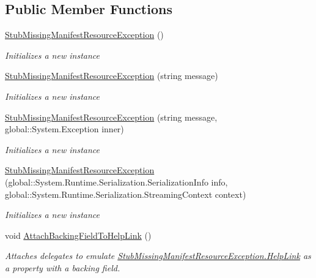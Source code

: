 \subsection*{Public Member Functions}
\begin{DoxyCompactItemize}
\item 
\hyperlink{class_system_1_1_resources_1_1_fakes_1_1_stub_missing_manifest_resource_exception_a3e02fd97284d3d8bd328d3ad11733f7a}{Stub\-Missing\-Manifest\-Resource\-Exception} ()
\begin{DoxyCompactList}\small\item\em Initializes a new instance\end{DoxyCompactList}\item 
\hyperlink{class_system_1_1_resources_1_1_fakes_1_1_stub_missing_manifest_resource_exception_af4e18492d1b9b3498101ae106c8bfc5c}{Stub\-Missing\-Manifest\-Resource\-Exception} (string message)
\begin{DoxyCompactList}\small\item\em Initializes a new instance\end{DoxyCompactList}\item 
\hyperlink{class_system_1_1_resources_1_1_fakes_1_1_stub_missing_manifest_resource_exception_a6f4668bbdab3f16f58813e8a607e9a70}{Stub\-Missing\-Manifest\-Resource\-Exception} (string message, global\-::\-System.\-Exception inner)
\begin{DoxyCompactList}\small\item\em Initializes a new instance\end{DoxyCompactList}\item 
\hyperlink{class_system_1_1_resources_1_1_fakes_1_1_stub_missing_manifest_resource_exception_a69baf59dff29d3c4faf5bd9926056ee5}{Stub\-Missing\-Manifest\-Resource\-Exception} (global\-::\-System.\-Runtime.\-Serialization.\-Serialization\-Info info, global\-::\-System.\-Runtime.\-Serialization.\-Streaming\-Context context)
\begin{DoxyCompactList}\small\item\em Initializes a new instance\end{DoxyCompactList}\item 
void \hyperlink{class_system_1_1_resources_1_1_fakes_1_1_stub_missing_manifest_resource_exception_aae8773a365a2341e8e49f70a2af57b1c}{Attach\-Backing\-Field\-To\-Help\-Link} ()
\begin{DoxyCompactList}\small\item\em Attaches delegates to emulate \hyperlink{class_system_1_1_resources_1_1_fakes_1_1_stub_missing_manifest_resource_exception_a2f4de3717d03f1edca5b06c2d4d1e801}{Stub\-Missing\-Manifest\-Resource\-Exception.\-Help\-Link} as a property with a backing field.\end{DoxyCompactList}\item 

\end{DoxyCompactItemize}

